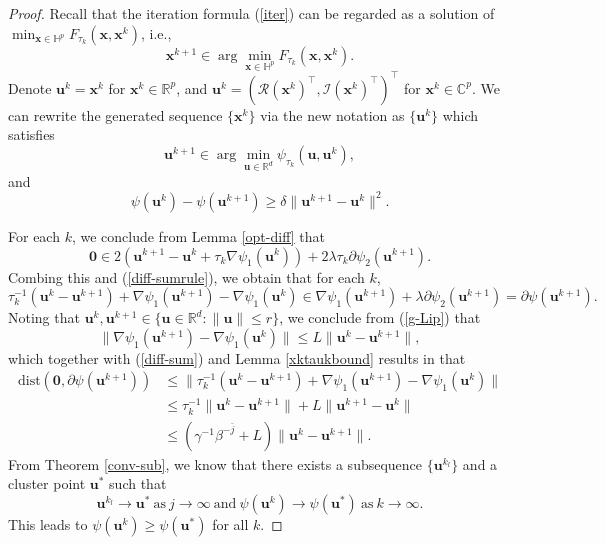 \documentclass{article}
\numberwithin{equation}{section}
\begin{document}
\begin{proof}
Recall that the iteration formula (\ref{iter}) can be regarded as a solution of $\min_{\mathbf{x}\in\mathbb{H}^p}F_{\tau_k}(\mathbf{x}, \mathbf{x}^k)$, i.e.,
$$\mathbf{x}^{k+1}\in\arg\min_{\mathbf{x}\in\mathbb{H}^p}F_{\tau_k}(\mathbf{x}, \mathbf{x}^k).$$
Denote $\mathbf{u}^k=\mathbf{x}^k$ for $\mathbf{x}^k\in\mathbb{R}^p$, and $\mathbf{u}^k=(\mathcal{R}(\mathbf{x}^k)^\top, \mathcal{I}(\mathbf{x}^k)^\top)^\top$ for $\mathbf{x}^k\in\mathbb{C}^p$. We can rewrite the generated sequence $\{\mathbf{x}^k\}$ via the new notation as $\{\mathbf{u}^k\}$ which satisfies
\begin{equation}\label{iter-u}\nonumber
	\mathbf{u}^{k+1}\in\arg\min_{\mathbf{u}\in\mathbb{R}^d}\psi_{\tau_k}(\mathbf{u}, \mathbf{u}^k),\end{equation}
and
\begin{equation}\label{armijo-u}
	\psi(\mathbf{u}^{k})-\psi(\mathbf{u}^{k+1})\geq\delta\|\mathbf{u}^{k+1}-\mathbf{u}^k\|^2.
\end{equation}

For each $k$, we conclude from Lemma \ref{opt-diff}  that
$$\mathbf{0}\in2(\mathbf{u}^{k+1}-\mathbf{u}^k+\tau_k\nabla \psi_1(\mathbf{u}^k))+2\lambda\tau_k\partial\psi_2(\mathbf{u}^{k+1}).$$
Combing this and (\ref{diff-sumrule}), we obtain that for each $k$,
\begin{equation}\label{diff-sum}
	\tau_k^{-1}(\mathbf{u}^{k}-\mathbf{u}^{k+1})+\nabla \psi_1(\mathbf{u}^{k+1})-\nabla \psi_1(\mathbf{u}^k)\in \nabla \psi_1(\mathbf{u}^{k+1})+\lambda\partial\psi_2(\mathbf{u}^{k+1})=\partial \psi(\mathbf{u}^{k+1}).
\end{equation}
Noting that $\mathbf{u}^{k},\mathbf{u}^{k+1}\in \{\mathbf{u}\in\mathbb{R}^d: \|\mathbf{u}\|\leq r\}$, we conclude from (\ref{g-Lip}) that
$$\|\nabla \psi_1(\mathbf{u}^{k+1})-\nabla \psi_1(\mathbf{u}^k)\|\leq L\|\mathbf{u}^{k}-\mathbf{u}^{k+1}\|,$$
which together with (\ref{diff-sum}) and Lemma \ref{xktaukbound} results in that
\begin{equation}\label{dist-upb}\nonumber
	\begin{aligned}
		\mathrm{dist}(\mathbf{0},\partial \psi(\mathbf{u}^{k+1}))&\leq \|\tau_k^{-1}(\mathbf{u}^{k}-\mathbf{u}^{k+1})+\nabla \psi_1(\mathbf{u}^{k+1})-\nabla \psi_1(\mathbf{u}^k)\|\\
		&\leq \tau_k^{-1}\|\mathbf{u}^{k}-\mathbf{u}^{k+1}\|+L\|\mathbf{u}^{k+1}-\mathbf{u}^k\|\\
		&\leq (\gamma^{-1}\beta^{-\bar{j}}+L)\|\mathbf{u}^{k}-\mathbf{u}^{k+1}\|.
\end{aligned}\end{equation}
From Theorem \ref{conv-sub}, we know that there exists a subsequence $\{\mathbf{u}^{k_l}\}$ and a cluster point $\mathbf{u}^*$ such that
\begin{equation}\label{u-conv} \mathbf{u}^{k_l}\to \mathbf{u}^*~\mbox{as}~j\to\infty~
	\mbox{and}~\psi(\mathbf{u}^{k})\to\psi(\mathbf{u}^*)~\mbox{as}~k\to\infty.
\end{equation}
This leads to $\psi(\mathbf{u}^k)\geq \psi(\mathbf{u}^*)$ for all $k$.



\end{proof}
\end{document}
